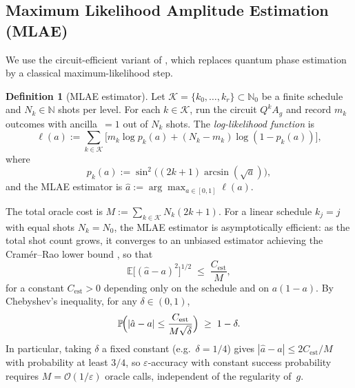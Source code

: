\documentclass[12pt,a4paper]{article}
\theoremstyle{plain}
\theoremstyle{definition}
\newtheorem{definition}[definition]{Definition}
\theoremstyle{remark}
\begin{document}
\subsection{Maximum Likelihood Amplitude Estimation (MLAE)}
\label{subsec:mlae}

We use the circuit-efficient variant of \cite{SuzukiEtAl2019}, which
replaces quantum phase estimation by a classical maximum-likelihood step.

\begin{definition}[MLAE estimator]
\label{def:mlae}
Let $\mathcal{K} = \{k_0,\ldots,k_r\} \subset \mathbb{N}_0$ be a
finite schedule and $N_k \in \mathbb{N}$ shots per level.
For each $k\in\mathcal{K}$, run the circuit $Q^k A_g$ and record
$m_k$ outcomes with ancilla~$=1$ out of $N_k$ shots.
The \emph{log-likelihood function} is
\begin{equation}
  \ell(a) :=
  \sum_{k\in\mathcal{K}}
  \bigl[m_k \log p_k(a)
       + (N_k - m_k)\log(1-p_k(a))\bigr],
  \label{eq:loglik}
\end{equation}
where
\[
  p_k(a) := \sin^2\!\bigl((2k+1)\arcsin(\sqrt{a})\bigr),
\]
and the MLAE estimator is
$\hat{a} := \arg\max_{a\in[0,1]}\ell(a)$.
\end{definition}

The total oracle cost is $M := \sum_{k\in\mathcal{K}} N_k(2k+1)$.
For a linear schedule $k_j = j$ with equal shots $N_k = N_0$, the
MLAE estimator is asymptotically efficient: as the total shot count
grows, it converges to an unbiased estimator achieving the
Cram\'{e}r--Rao lower bound
\cite[Theorem~1 and Eq.~(13)]{SuzukiEtAl2019}, so that
\begin{equation}
  \mathbb{E}\bigl[(\hat{a}-a)^2\bigr]^{1/2}
  \;\leq\; \frac{C_{\mathrm{est}}}{M},
  \label{eq:mlae_mse}
\end{equation}
for a constant $C_{\mathrm{est}} > 0$ depending only on the schedule
and on $a(1-a)$.
By Chebyshev's inequality, for any $\delta\in(0,1)$,
\begin{equation}
  \mathbb{P}\!\Bigl(|\hat{a}-a| \leq \frac{C_{\mathrm{est}}}{M\sqrt{\delta}}\Bigr)
  \;\geq\; 1 - \delta.
  \label{eq:mlae_hp}
\end{equation}
In particular, taking $\delta$ a fixed constant (e.g.\ $\delta = 1/4$)
gives $|\hat{a}-a| \leq 2C_{\mathrm{est}}/M$ with probability at least
$3/4$, so $\varepsilon$-accuracy with constant success probability
requires $M = \mathcal{O}(1/\varepsilon)$ oracle calls, independent of
the regularity of~$g$.
\end{document}

